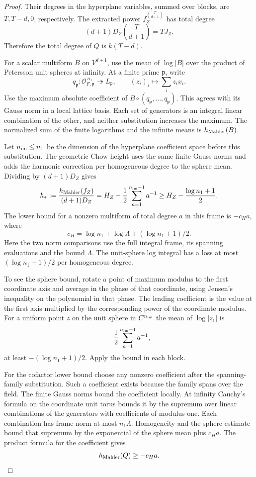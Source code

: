 \begin{proof}
Their degrees in the hyperplane variables, summed over
blocks, are \(T,T-d,0\), respectively. The extracted
power \(f_Z^{\binom{T}{d+1}}\) has total degree
\[
 (d+1)D_Z\binom{T}{d+1}=TJ_Z.
\]
Therefore the total
degree of \(Q\) is \(k(T-d)\).

For a scalar multiform \(B\) on \(V^{d+1}\), use the mean of
\(\log|B|\) over the product of Petersson unit spheres at infinity.
At a finite prime \(\mathfrak p\), write
\[
 q_{\mathfrak p}:\mathcal O_{F,\mathfrak p}^{\,n_1}\twoheadrightarrow L_{\mathfrak p},
 \qquad (z_i)_i\longmapsto\sum_i z_i x_i .
\]
Use the maximum absolute coefficient of \(B\circ(q_{\mathfrak p},\ldots,q_{\mathfrak p})\).
This agrees with its Gauss norm in a local lattice basis. Each set of generators
is an integral linear combination of the other, and neither substitution
increases the maximum. The normalized sum of the finite logarithms
and the infinite means is \(h_{\rm Mahler}(B)\).

Let \(n_{\rm im}\le n_1\) be the dimension of the
hyperplane coefficient space before this substitution.
The geometric Chow height uses the same finite Gauss
norms and adds the harmonic correction per homogeneous
degree to the sphere mean. Dividing by \((d+1)D_Z\) gives
\[
 h_*:=\frac{h_{\rm Mahler}(f_Z)}{(d+1)D_Z}
 = H_Z-\frac12\sum_{a=1}^{n_{\rm im}-1}a^{-1}
 \ge H_Z-\frac{\log n_1+1}{2}.
\]
The lower bound for a nonzero multiform of total degree \(a\)
in this frame is \(-c_Ha\), where
\[
 c_H=\log n_1+\log\Lambda+(\log n_1+1)/2.
\]
Here the two norm comparisons use the full integral frame,
its spanning evaluations and the bound \(\Lambda\).
The unit-sphere log integral has a loss at most
\((\log n_1+1)/2\) per homogeneous degree.

To see the
sphere bound, rotate a point of maximum modulus to the
first coordinate axis and average in the phase of that
coordinate, using Jensen's inequality on the polynomial
in that phase. The leading coefficient is the value at
the first axis multiplied by the corresponding power of
the coordinate modulus. For a uniform point \(z\) on the unit
sphere in \(\mathbb C^{n_{\rm im}}\) the mean of \(\log|z_1|\) is
\[
 -\frac12\sum_{a=1}^{n_{\rm im}-1}a^{-1},
\]
at least
\(-(\log n_1+1)/2\). Apply the bound in each block.

For the cofactor lower bound choose any nonzero coefficient
after the spanning-family substitution. Such a coefficient
exists because the family spans over the field. The finite
Gauss norms bound the coefficient locally. At infinity
Cauchy's formula on the coordinate unit torus bounds it by
the supremum over linear combinations of the generators
with coefficients of modulus one. Each combination has
frame norm at most \(n_1\Lambda\). Homogeneity and the
sphere estimate bound that supremum by the exponential
of the sphere mean plus \(c_H a\). The product formula
for the coefficient gives
\[
 h_{\rm Mahler}(Q)\ge-c_Ha.
\]



\end{proof}
